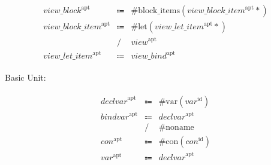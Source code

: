 \begin{align*}
    \begin{array}{rcll}
        \mathit{view\_block}^\mathrm{apt}
        &\Coloneq &\mathrm{\#block\_items}(\mathit{view\_block\_item}^\mathrm{apt}{*}) \\
        \mathit{view\_block\_item}^\mathrm{apt}
        &\Coloneq &\mathrm{\#let}(\mathit{view\_let\_item}^\mathrm{apt}{*}) \\
        &\mathrel{/} &\mathit{view}^\mathrm{apt} \\
        \mathit{view\_let\_item}^\mathrm{apt}
        &\Coloneq &\mathit{view\_bind}^\mathrm{apt}
    \end{array}
\end{align*}

Basic Unit:

\begin{align*}
    \begin{array}{rcll}
        \mathit{declvar}^\mathrm{apt}
        &\Coloneq &\mathrm{\#var}(\mathit{var}^\mathrm{id}) \\
        \mathit{bindvar}^\mathrm{apt}
        &\Coloneq &\mathit{declvar}^\mathrm{apt} \\
        &\mathrel{/} &\mathrm{\#noname} \\
        \mathit{con}^\mathrm{apt}
        &\Coloneq &\mathrm{\#con}(\mathit{con}^\mathrm{id}) \\
        \mathit{var}^\mathrm{apt}
        &\Coloneq &\mathit{declvar}^\mathrm{apt}
    \end{array}
\end{align*}
